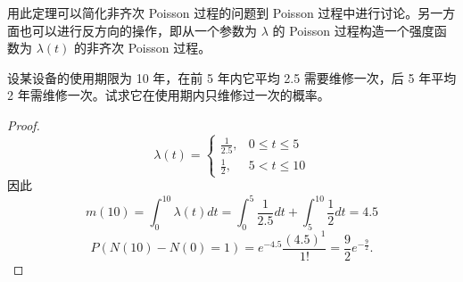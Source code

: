 \documentclass[lang=cn,10pt,thmcnt=section]{elegantbook}
\begin{document}
\begin{remark}

	用此定理可以简化非齐次 Poisson 过程的问题到 Poisson 过程中进行讨论。另一方面也可以进行反方向的操作，即从一个参数为 $\lambda$ 的 Poisson 过程构造一个强度函数为 $\lambda(t)$ 的非齐次 Poisson 过程。
\end{remark}
\begin{example}
	设某设备的使用期限为 10 年，在前 5 年内它平均 2.5 需要维修一次，后 5 年平均 2 年需维修一次。试求它在使用期内只维修过一次的概率。
\end{example}
\begin{proof}
\[
\lambda(t) = 
\begin{cases} 
\frac{1}{2.5}, & 0 \leq t \leq 5 \\
\frac{1}{2}, & 5 < t \leq 10 
\end{cases}
\]
因此
\[
m(10) = \int_{0}^{10} \lambda(t) dt = \int_{0}^{5} \frac{1}{2.5} dt + \int_{5}^{10} \frac{1}{2} dt = 4.5
\]
\[
P(N(10) - N(0) = 1) = e^{-4.5} \frac{(4.5)^1}{1!} = \frac{9}{2} e^{-\frac{9}{2}}.
\]
\end{proof}
\end{document}
